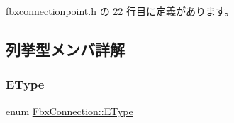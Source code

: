  fbxconnectionpoint.\+h の 22 行目に定義があります。



\subsection{列挙型メンバ詳解}
\mbox{\label{class_fbx_connection_a3df448a5db356652ab99fd2be2553749}} 
\subsubsection{\texorpdfstring{E\+Type}{EType}}
{\footnotesize\ttfamily enum \hyperlink{class_fbx_connection_a3df448a5db356652ab99fd2be2553749}{Fbx\+Connection\+::\+E\+Type}}

